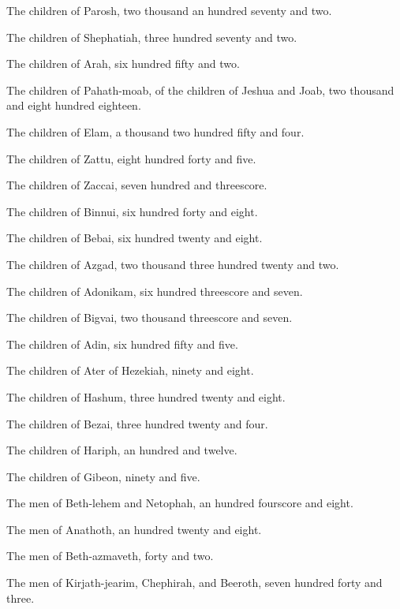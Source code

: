 {The
children of
Parosh,
two
thousand an
hundred
seventy and
two.

The
children of
Shephatiah,
three
hundred
seventy and
two.

The
children of
Arah,
six
hundred
fifty and
two.

The
children of
Pahath-moab, of the
children of
Jeshua and
Joab, two
thousand and
eight
hundred
{}
eighteen.

The
children of
Elam, a
thousand two
hundred
fifty and
four.

The
children of
Zattu,
eight
hundred
forty and
five.

The
children of
Zaccai,
seven
hundred and
threescore.

The
children of
Binnui,
six
hundred
forty and
eight.

The
children of
Bebai,
six
hundred
twenty and
eight.

The
children of
Azgad,
two
thousand
three
hundred
twenty and
two.

The
children of
Adonikam,
six
hundred
threescore and
seven.

The
children of
Bigvai, two
thousand
threescore and
seven.

The
children of
Adin,
six
hundred
fifty and
five.

The
children of
Ater of
Hezekiah,
ninety and
eight.

The
children of
Hashum,
three
hundred
twenty and
eight.

The
children of
Bezai,
three
hundred
twenty and
four.

The
children of
Hariph, an
hundred and
twelve.

The
children of
Gibeon,
ninety and
five.

The
men of
Beth-lehem and
Netophah, an
hundred
fourscore and
eight.

The
men of
Anathoth, an
hundred
twenty and
eight.

The
men of
Beth-azmaveth,
forty and
two.

The
men of
Kirjath-jearim,
Chephirah, and
Beeroth,
seven
hundred
forty and
three.

}
